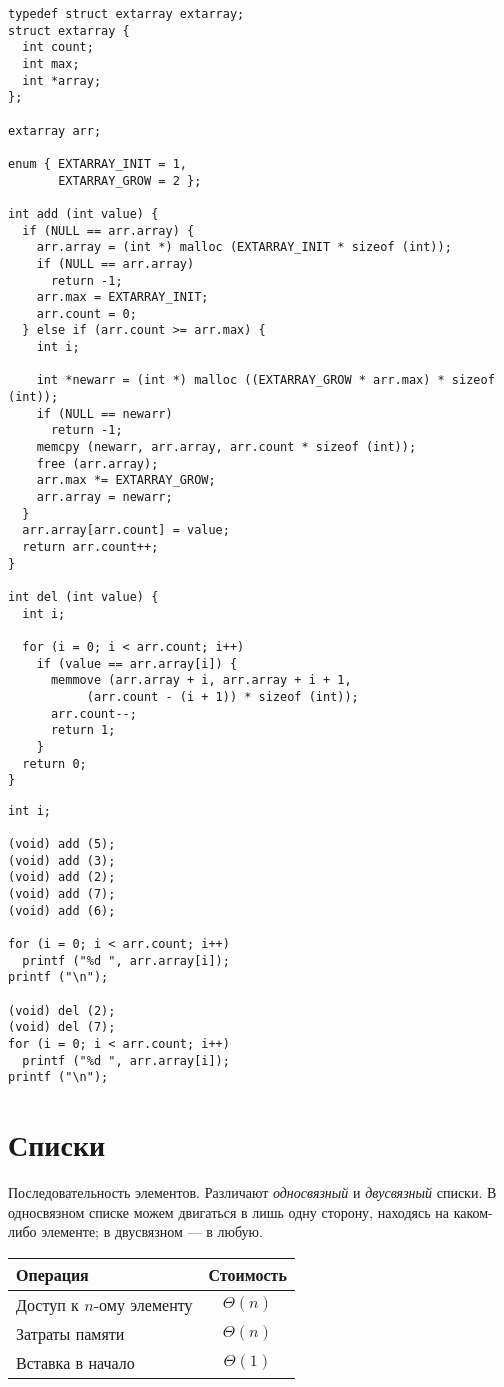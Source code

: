 \lstset{label=lst:dynarray-impl,caption=Некоторые операции}
\begin{lstlisting}
typedef struct extarray extarray;
struct extarray {
  int count;
  int max;
  int *array;
};

extarray arr;

enum { EXTARRAY_INIT = 1,
       EXTARRAY_GROW = 2 };

int add (int value) {
  if (NULL == arr.array) {
    arr.array = (int *) malloc (EXTARRAY_INIT * sizeof (int));
    if (NULL == arr.array)
      return -1;
    arr.max = EXTARRAY_INIT;
    arr.count = 0;
  } else if (arr.count >= arr.max) {
    int i;

    int *newarr = (int *) malloc ((EXTARRAY_GROW * arr.max) * sizeof (int));
    if (NULL == newarr)
      return -1;
    memcpy (newarr, arr.array, arr.count * sizeof (int));
    free (arr.array);
    arr.max *= EXTARRAY_GROW;
    arr.array = newarr;
  }
  arr.array[arr.count] = value;
  return arr.count++;
}

int del (int value) {
  int i;

  for (i = 0; i < arr.count; i++)
    if (value == arr.array[i]) {
      memmove (arr.array + i, arr.array + i + 1,
	       (arr.count - (i + 1)) * sizeof (int));
      arr.count--;
      return 1;
    }
  return 0;
}
\end{lstlisting}

\lstset{label=lst:dynarray-usage,caption=Пример использования}
\begin{lstlisting}
int i;

(void) add (5);
(void) add (3);
(void) add (2);
(void) add (7);
(void) add (6);

for (i = 0; i < arr.count; i++)
  printf ("%d ", arr.array[i]);
printf ("\n");

(void) del (2);
(void) del (7);
for (i = 0; i < arr.count; i++)
  printf ("%d ", arr.array[i]);
printf ("\n");
\end{lstlisting}

\section{Списки}
\label{sec:lists}

Последовательность элементов. Различают \emph{односвязный} и \emph{двусвязный} списки. В односвязном списке можем двигаться в лишь одну сторону, находясь на каком-либо элементе; в двусвязном --- в любую.
\begin{center}
  \begin{tabular}{lc}
    \toprule
    Операция & Стоимость \\
    \midrule
    Доступ к $n$-ому элементу & $\Theta(n)$ \\
    Затраты памяти & $\Theta(n)$ \\
    Вставка в начало & $\Theta(1)$ \\
    \bottomrule
  \end{tabular}
\end{center}

